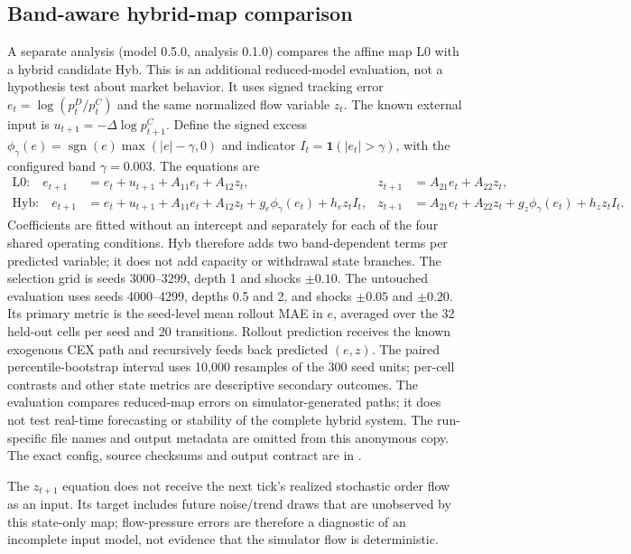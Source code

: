 \subsection{Band-aware hybrid-map comparison}
\label{sec:hybrid-method}

A separate analysis (model 0.5.0, analysis 0.1.0) compares the affine map L0 with a hybrid candidate Hyb. This is an additional reduced-model evaluation, not a hypothesis test about market behavior. It uses signed tracking error $e_t=\log(p_t^D/p_t^C)$ and the same normalized flow variable $z_t$. The known external input is $u_{t+1}=-\Delta\log p^C_{t+1}$. Define the signed excess $\phi_\gamma(e)=\operatorname{sgn}(e)\max(|e|-\gamma,0)$ and indicator $I_t=\mathbf{1}(|e_t|>\gamma)$, with the configured band $\gamma=0.003$. The equations are
\begin{align}
  \text{L0:}\quad e_{t+1}&=e_t+u_{t+1}+A_{11} e_t+A_{12} z_t,& z_{t+1}&=A_{21} e_t+A_{22} z_t,\\
  \text{Hyb:}\quad e_{t+1}&=e_t+u_{t+1}+A_{11} e_t+A_{12} z_t+g_e\phi_\gamma(e_t)+h_e z_t I_t,&
  z_{t+1}&=A_{21} e_t+A_{22} z_t+g_z\phi_\gamma(e_t)+h_z z_t I_t.
\end{align}
Coefficients are fitted without an intercept and separately for each of the four shared operating conditions. Hyb therefore adds two band-dependent terms per predicted variable; it does not add capacity or withdrawal state branches. The selection grid is seeds 3000--3299, depth 1 and shocks $\pm0.10$. The untouched evaluation uses seeds 4000--4299, depths 0.5 and 2, and shocks $\pm0.05$ and $\pm0.20$. Its primary metric is the seed-level mean rollout MAE in $e$, averaged over the 32 held-out cells per seed and 20 transitions. Rollout prediction receives the known exogenous CEX path and recursively feeds back predicted $(e,z)$. The paired percentile-bootstrap interval uses 10,000 resamples of the 300 seed units; per-cell contrasts and other state metrics are descriptive secondary outcomes. The evaluation compares reduced-map errors on simulator-generated paths; it does not test real-time forecasting or stability of the complete hybrid system. \ifdefined\blindreviewmode
The run-specific file names and output metadata are omitted from this anonymous copy.
\else
The exact config, source checksums and output contract are in .
\fi

The $z_{t+1}$ equation does not receive the next tick's realized stochastic order flow as an input. Its target includes future noise/trend draws that are unobserved by this state-only map; flow-pressure errors are therefore a diagnostic of an incomplete input model, not evidence that the simulator flow is deterministic.

